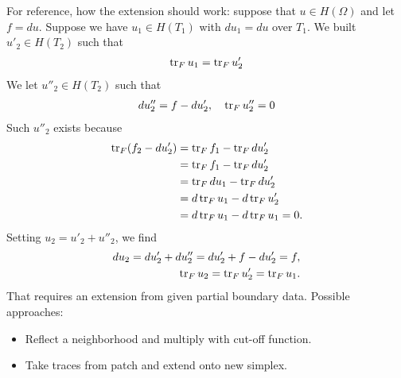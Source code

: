 \documentclass[10pt,a4paper]{article}
\begin{document}
\begin{remark}
    For reference, how the extension should work:
    suppose that $u \in H(\Omega)$ and let $f = du$.
    Suppose we have $u_1 \in H(T_1)$ with $du_1 = du$ over $T_1$. 
    We built $u'_2 \in H(T_2)$ such that 
    \begin{align*}
        \operatorname{tr}_F u_1 = \operatorname{tr}_F u'_2
    \end{align*}
    We let $u''_2 \in H(T_2)$ such that 
    \begin{align*}
        d u''_2 = f - d u'_2, \quad \operatorname{tr}_F u''_2 = 0
    \end{align*}
    Such $u''_2$ exists because 
    \begin{align*}
        \operatorname{tr}_F( f_2 - d u'_2 ) 
        &= 
        \operatorname{tr}_F f_1 - \operatorname{tr}_F d u'_2
        \\&= 
        \operatorname{tr}_F f_1 - \operatorname{tr}_F d u'_2
        \\&= 
        \operatorname{tr}_F d u_1 - \operatorname{tr}_F d u'_2
        \\&= 
        d \operatorname{tr}_F u_1 - d \operatorname{tr}_F u'_2
        \\&= 
        d \operatorname{tr}_F u_1 - d \operatorname{tr}_F u_1
        = 0
        .
    \end{align*}
    Setting $u_2 = u'_2 + u''_2$, we find 
    \begin{align*}
        d u_2 = d u'_2 + d u''_2 = d u'_2 + f - d u'_2 = f,
        \\
        \operatorname{tr}_F u_2 = \operatorname{tr}_F u'_2 = \operatorname{tr}_F u_1.
    \end{align*}
    That requires an extension from given partial boundary data. 
    Possible approaches:
    \begin{itemize}
        \item Reflect a neighborhood and multiply with cut-off function.
        \item Take traces from patch and extend onto new simplex. 
    \end{itemize}
\end{remark}
\end{document}
